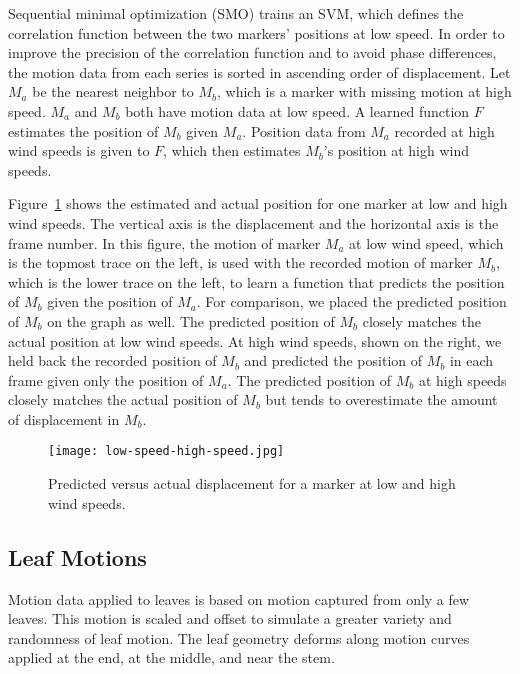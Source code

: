 Sequential minimal optimization (SMO) \cite{keerthi:nc01,platt:mit99} trains an SVM, which defines the correlation function between the two markers' positions at low speed. In order to improve the precision of the correlation function and to avoid phase differences, the motion data from each series is sorted in ascending order of displacement. Let $M_a$ be the nearest neighbor to $M_b$, which is a marker with missing motion at high speed. $M_a$ and $M_b$ both have motion data at low speed.  A learned function $F$ estimates the position of $M_b$ given $M_a$. Position data from $M_a$ recorded at high wind speeds is given to $F$, which then estimates $M_b$'s position at high wind speeds.  

Figure~\ref{fig:result_curve} shows the estimated and actual position for one marker at low and high wind speeds. The vertical axis is the displacement and the horizontal axis is the frame number. In this figure, the motion of marker $M_a$ at low wind speed, which is the topmost trace on the left, is used with the recorded motion of marker $M_b$, which is the lower trace on the left, to learn a function that predicts the position of $M_b$ given the position of $M_a$.  For comparison, we placed the predicted position of $M_b$ on the graph as well.  The predicted position of $M_b$ closely matches the actual position at low wind speeds.  At high wind speeds, shown on the right, we held back the recorded position of $M_b$ and predicted the position of $M_b$ in each frame given only the position of $M_a$.  The predicted position of $M_b$ at high speeds closely matches the actual position of $M_b$ but tends to overestimate the amount of displacement in $M_b$. 

\begin{figure}[ht]
\centering
\texttt{[image: low-speed-high-speed.jpg]}
\caption[Predicted versus actual displacement.]{Predicted versus actual displacement for a marker at low and high wind speeds.}
\label{fig:result_curve} 
\end{figure}

\subsection{ Leaf Motions}

Motion data applied to leaves is based on motion captured from only a few leaves. This motion is scaled and offset to simulate a greater variety and randomness of leaf motion. The leaf geometry deforms along motion curves applied at the end, at the middle, and near the stem.

